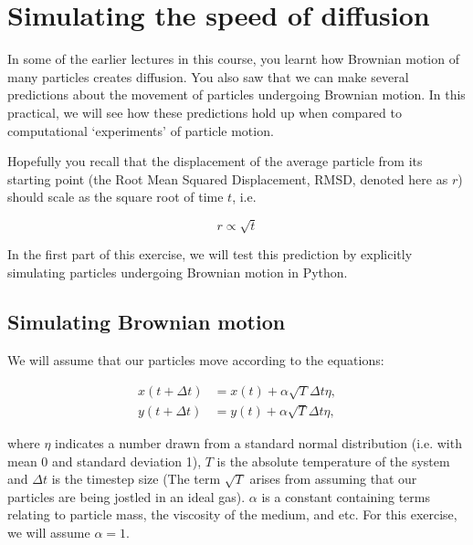 \documentclass[11pt, oneside]{article}
\begin{document}
	\section{Simulating the speed of diffusion}
	
	In some of the earlier lectures in this course, you learnt how Brownian motion of many particles creates diffusion. You also saw that we can make several predictions about the movement of particles undergoing Brownian motion. In this practical, we will see how these predictions hold up when compared to computational `experiments' of particle motion.
	
	Hopefully you recall that the displacement of the average particle from its starting point (the Root Mean Squared Displacement, RMSD, denoted here as $r$) should scale as the square root of time $t$, i.e.
	
	\begin{equation}
		r \propto \sqrt{t}
	\end{equation}
	
	In the first part of this exercise, we will test this prediction by explicitly simulating particles undergoing Brownian motion in Python.
	
	\subsection{Simulating Brownian motion}
	
 	We will assume that our particles move according to the equations:
 	
 	\begin{subequations}
 		\begin{align}
	 		x(t+\Delta t) &= x(t) + \alpha \sqrt{T} \Delta t \eta, \\
	 		y(t+\Delta t) &= y(t) + \alpha \sqrt{T} \Delta t \eta,
 		\end{align}
 		\label{eq:EOM}
 	\end{subequations}
 
 	\noindent
 	where $\eta$ indicates a number drawn from a standard normal distribution (i.e. with mean 0 and standard deviation 1), $T$ is the absolute temperature of the system and $\Delta t$ is the timestep size (The term $\sqrt{T}$ arises from assuming that our particles are being jostled in an ideal gas). $\alpha$ is a constant containing terms relating to particle mass, the viscosity of the medium, and etc. For this exercise, we will assume $\alpha = 1$.
 	
 	\bigskip
 	
\end{document}
